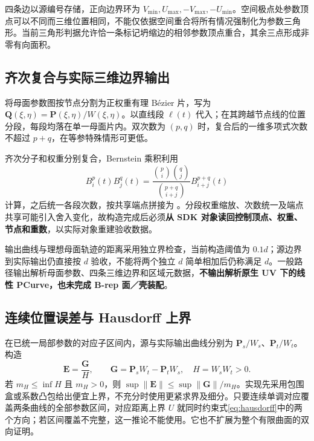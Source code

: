 \documentclass[UTF8,zihao=5,fontset=windows,a4paper]{ctexart}
\newcommand{\code}[1]{\texttt{\detokenize{#1}}}
\begin{document}
四条边以源编号存储，正向边界环为 $V_{\min},U_{\max},-V_{\max},-U_{\min}$。空间极点处参数顶点可以不同而三维位置相同，不能仅依据空间重合将所有情况强制化为参数三角形。当前三角形判据允许恰一条标记坍缩边的相邻参数顶点重合，其余三点形成非零有向面积。

\begin{center}
\end{center}

\subsection{齐次复合与实际三维边界输出}
将母面参数图按节点分割为正权重有理 Bézier 片，写为 $\mathbf Q(\xi,\eta)=\mathbf P(\xi,\eta)/W(\xi,\eta)$。以直线段 $\boldsymbol\ell(t)$ 代入；在其跨越节点线的位置分段，每段均落在单一母面片内。双次数为 $(p,q)$ 时，复合后的一维多项式次数不超过 $p+q$，在等参特殊情形可更低。

齐次分子和权重分别复合，Bernstein 乘积利用
\[
B_i^p(t)B_j^q(t)=\frac{\binom pi\binom qj}{\binom{p+q}{i+j}}B_{i+j}^{p+q}(t)
\]
计算，之后统一各段次数，按共享端点拼接为 \code{sggk::BSplineCurve3D}。分段权重缩放、次数统一及端点共享可能引入舍入变化，故构造完成后必须\textbf{从 SDK 对象读回控制顶点、权重、节点和重数}，以实际对象重建验收数据。

输出曲线与理想母面轨迹的距离采用独立界检查，当前构造阈值为 $0.1d$；源边界到实际输出仍直接按 $d$ 验收，不能将两个独立 $d$ 简单相加后仍称满足 $d$。一般路径输出解析母面参数、四条三维边界和区域元数据，\textbf{不输出解析原生 UV 下的线性 PCurve，也未完成 B-rep 面／壳装配}。

\newpage
\subsection{连续位置误差与 Hausdorff 上界}
在已统一局部参数的对应子区间内，源与实际输出曲线分别为 $\mathbf P_s/W_s$、$\mathbf P_t/W_t$。构造
\begin{equation}\label{eq:error}
\mathbf E=\frac{\mathbf G}{H},\qquad
\mathbf G=\mathbf P_sW_t-\mathbf P_tW_s,\quad H=W_sW_t>0.
\end{equation}
若 $m_H\le\inf H$ 且 $m_H>0$，则 $\sup\|\mathbf E\|\le\sup\|\mathbf G\|/m_H$。实现先采用包围盒或系数凸包给出便宜上界，不充分时使用更紧求界及细分。只要连续单调对应覆盖两条曲线的全部参数区间，对应距离上界 $U$ 就同时约束式\eqref{eq:hausdorff}中的两个方向；若区间覆盖不完整，这一推论不能使用。它也不扩展为整个有限曲面的双向证明。
\end{document}
